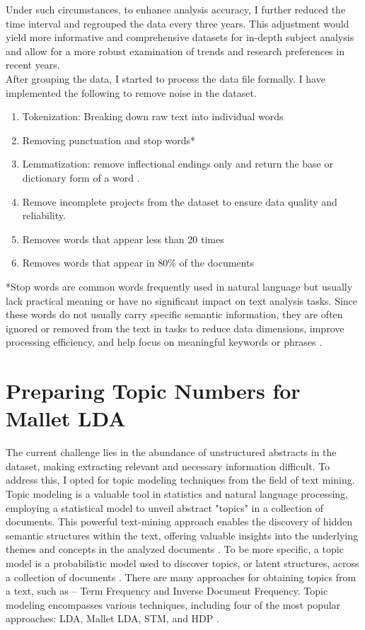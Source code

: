 Under such circumstances, to enhance analysis accuracy, I further reduced the time interval and regrouped the data every three years. This adjustment would yield more informative and comprehensive datasets for in-depth subject analysis and allow for a more robust examination of trends and research preferences in recent years.\\

After grouping the data, I started to process the data file formally. I have implemented the following to remove noise in the dataset.

\begin{enumerate}
  \item Tokenization: Breaking down raw text into individual words
  \item Removing punctuation and stop words*
  \item Lemmatization: remove inflectional endings only and return the base or dictionary form of a word \citep{kurt2020topic}.
  \item Remove incomplete projects from the dataset to ensure data quality and reliability.
  \item Removes words that appear less than 20 times
  \item Removes words that appear in 80\% of the documents
\end{enumerate}

*Stop words are common words frequently used in natural language but usually lack practical meaning or have no significant impact on text analysis tasks. Since these words do not usually carry specific semantic information, they are often ignored or removed from the text in tasks to reduce data dimensions, improve processing efficiency, and help focus on meaningful keywords or phrases \citep{rajaraman2011mining}.

\section*{Preparing Topic Numbers for Mallet LDA}

The current challenge lies in the abundance of unstructured abstracts  in the dataset, making extracting relevant and necessary information difficult. To address this, I opted for topic modeling techniques from the field of text mining. \\

Topic modeling is a valuable tool in statistics and natural language processing, employing a statistical model to unveil abstract "topics" in a collection of documents. This powerful text-mining approach enables the discovery of hidden semantic structures within the text, offering valuable insights into the underlying themes and concepts in the analyzed documents \citep{arun2010finding}. To be more specific, a topic model is a probabilistic model used to discover topics, or latent structures, across a collection of documents \citep{saxton2018gentle}. There are many approaches for obtaining topics from a text, such as – Term Frequency and Inverse Document Frequency. Topic modeling encompasses various techniques, including four of the most popular approaches: LDA, Mallet LDA, STM, and HDP \citep{egger2022topic}.\\

